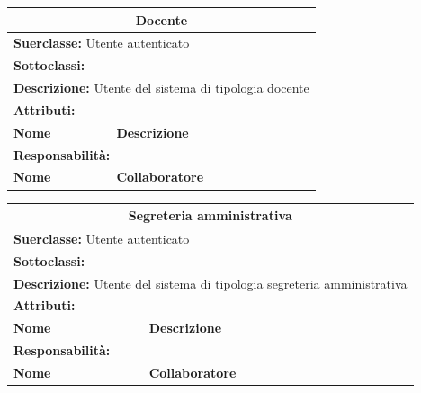\documentclass[11pt]{article}
\begin{document}
\begin{table}[H]
\centering
\begin{tabularx}{1\textwidth}{|X|X|}\hline
\multicolumn{2}{|c|}{\textbf{Docente}}\\\hline
\multicolumn{2}{|l|}{\textbf{Suerclasse:} Utente autenticato}\\\hline
\multicolumn{2}{|l|}{\textbf{Sottoclassi:} }\\\hline
\multicolumn{2}{|l|}{\textbf{Descrizione:} Utente del sistema di tipologia docente}\\\hline
\multicolumn{2}{|l|}{\textbf{Attributi:}}\\
\textbf{Nome} & \textbf{Descrizione}\\
\hline
\multicolumn{2}{|l|}{\textbf{Responsabilità:}}\\
\textbf{Nome} & \textbf{Collaboratore}\\
\hline
\end{tabularx}
\end{table}



\begin{table}[H]
\centering
\begin{tabularx}{1\textwidth}{|X|X|}\hline
\multicolumn{2}{|c|}{\textbf{Segreteria amministrativa}}\\\hline
\multicolumn{2}{|l|}{\textbf{Suerclasse:} Utente autenticato}\\\hline
\multicolumn{2}{|l|}{\textbf{Sottoclassi:} }\\\hline
\multicolumn{2}{|l|}{\textbf{Descrizione:} Utente del sistema di tipologia segreteria amministrativa}\\\hline
\multicolumn{2}{|l|}{\textbf{Attributi:}}\\
\textbf{Nome} & \textbf{Descrizione}\\
\hline
\multicolumn{2}{|l|}{\textbf{Responsabilità:}}\\
\textbf{Nome} & \textbf{Collaboratore}\\
\hline
\end{tabularx}
\end{table}
\end{document}
